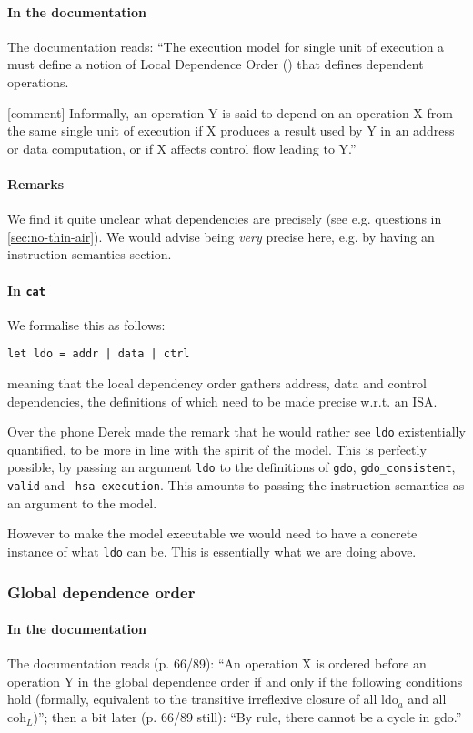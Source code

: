 \documentclass[a4paper]{article}
\begin{document}
\paragraph{In the documentation}
The documentation reads: ``The execution model for single unit of execution a
must define a notion of Local Dependence Order () that defines dependent
operations.

[comment] Informally, an operation Y is said to depend on an operation X from
the same single unit of execution if X produces a result used by Y in an
address or data computation, or if X affects control flow leading to Y.''

\paragraph{Remarks} We find it quite unclear what dependencies are precisely
(see e.g. questions in \mysec\ref{sec:no-thin-air}).  We would advise being
\emph{very} precise here, e.g. by having an instruction semantics section.

\paragraph{In {\tt cat}}
We formalise this as follows:
\begin{verbatim}
let ldo = addr | data | ctrl 
\end{verbatim}

meaning that the local dependency order gathers address, data and control
dependencies, the definitions of which need to be made precise w.r.t. an ISA.

{\color{blue} Over the phone Derek made the remark that he would rather see
{\tt ldo} existentially quantified, to be more in line with the spirit of the
model. This is perfectly possible, by passing an argument {\tt ldo} to the
definitions of {\tt gdo}, {\tt gdo\_consistent}, {\tt valid} and {\tt
hsa-execution}. This amounts to passing the instruction semantics as an
argument to the model.

However to make the model executable we would need to have a concrete instance
of what {\tt ldo} can be. This is essentially what we are doing above.}

\subsubsection{Global dependence order}

\paragraph{In the documentation}
The documentation reads (p. 66/89): ``An operation X is ordered before an
operation Y in the global dependence order if and only if the following
conditions hold (formally, equivalent to the transitive irreflexive closure of
all ldo$_{a}$ and all coh$_L$)''; then a bit later (p. 66/89 still): ``By rule,
there cannot be a cycle in gdo.''
\end{document}
